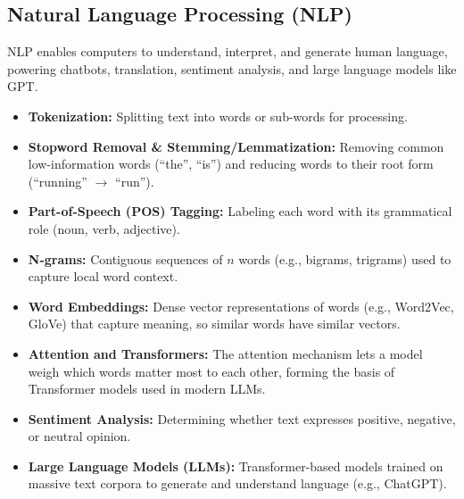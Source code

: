 \documentclass[11pt,a4paper]{article}
\begin{document}
\subsection{Natural Language Processing (NLP)}
\begin{definitionbox}[NLP]
NLP enables computers to understand, interpret, and generate human language, powering chatbots, translation, sentiment analysis, and large language models like GPT.
\end{definitionbox}
\begin{itemize}[leftmargin=*]
  \item \textbf{Tokenization:} Splitting text into words or sub-words for processing.
  \item \textbf{Stopword Removal \& Stemming/Lemmatization:} Removing common low-information words (``the'', ``is'') and reducing words to their root form (``running'' $\to$ ``run'').
  \item \textbf{Part-of-Speech (POS) Tagging:} Labeling each word with its grammatical role (noun, verb, adjective).
  \item \textbf{N-grams:} Contiguous sequences of $n$ words (e.g., bigrams, trigrams) used to capture local word context.
  \item \textbf{Word Embeddings:} Dense vector representations of words (e.g., Word2Vec, GloVe) that capture meaning, so similar words have similar vectors.
  \item \textbf{Attention and Transformers:} The attention mechanism lets a model weigh which words matter most to each other, forming the basis of Transformer models used in modern LLMs.
  \item \textbf{Sentiment Analysis:} Determining whether text expresses positive, negative, or neutral opinion.
  \item \textbf{Large Language Models (LLMs):} Transformer-based models trained on massive text corpora to generate and understand language (e.g., ChatGPT).
\end{itemize}
\end{document}
